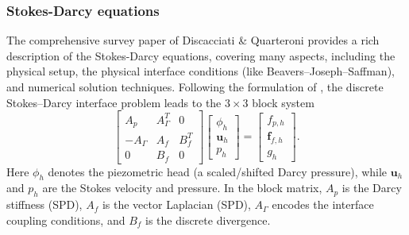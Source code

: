 \documentclass{article}
\begin{document}
\subsubsection{Stokes-Darcy equations}
The comprehensive survey paper of Discacciati \& Quarteroni \cite{discacciati2009navier}
provides a rich description of the Stokes-Darcy equations, covering many aspects, including the physical setup, 
the physical interface conditions (like Beavers–Joseph–Saffman), and numerical solution techniques. Following the formulation of \cite{cmx09,cls16}, the discrete Stokes--Darcy interface problem leads to the $3\times3$ block system
\begin{equation}
\label{eqn:darcystokes}
\begin{bmatrix}
A_p & A_{\Gamma}^{T} & 0 \\
- A_{\Gamma} & A_f & B_f^{T} \\
0 & B_f & 0
\end{bmatrix}
\begin{bmatrix}
\phi_h \\[2pt]
\mathbf{u}_h \\[2pt]
p_h
\end{bmatrix}
=
\begin{bmatrix}
f_{p,h} \\[2pt]
\mathbf{f}_{f,h} \\[2pt]
g_h
\end{bmatrix}.
\end{equation}
Here $\phi_h$ denotes the piezometric head (a scaled/shifted Darcy pressure), while $\mathbf{u}_h$ and $p_h$ are the Stokes velocity and pressure. In the block matrix, $A_p$ is the Darcy stiffness (SPD), $A_f$ is the vector Laplacian (SPD), $A_{\Gamma}$ encodes the interface coupling conditions, and $B_f$ is the discrete divergence.
\end{document}
